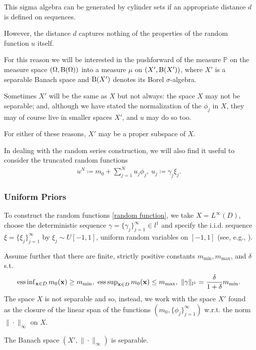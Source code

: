 \documentclass[oneside]{article}
\numberwithin{equation}{section}
\begin{document}
This sigma algebra can be generated by cylinder sets if an appropriate distance $d$ is defined on sequences.

However, the distance $d$ captures nothing of the properties of the random function $u$ itself.

For this reason we will be interested in the pushforward of the measure $\mathbb{P}$ on the measure space $(\Omega,{\rm B}(\Omega))$ into a measure $\mu$ on $(X',{\rm B}(X'))$, where $X'$ is a separable Banach space and ${\rm B}(X')$ denotes its Borel $\sigma$-algebra.

Sometimes $X'$ will be the same as $X$ but not always: the space $X$ may not be separable; and, although we have stated the normalization of the $\phi_j$ in $X$, they may of course live in smaller spaces $X'$, and $u$ may do so too.

For either of these reasons, $X'$ may be a proper subspace of $X$.

%
In dealing with the random series construction, we will also find it useful to consider the truncated random functions
\begin{align*}
    u^N\coloneqq m_0 + \sum_{j=1}^N u_j\phi_j,\ u_j\coloneqq\gamma_j\xi_j.
\end{align*}

\subsubsection{Uniform Priors}
To construct the random functions \eqref{random function}, we take $X = L^\infty(D)$, choose the deterministic sequence $\gamma = \{\gamma_j\}_{j=1}^\infty\in l^1$ and specify the i.i.d. sequence $\xi = \{\xi_j\}_{j=1}^\infty$ by $\xi_j\sim U[-1,1]$, uniform random variables on $[-1,1]$ (see, e.g., \cite[Sect. 3.3]{Pope2000}).

Assume further that there are finite, strictly positive constants $m_{\min},m_{\max}$, and $\delta$ s.t.
\begin{align*}
    \operatorname{ess\inf}_{{\bf x}\in D} m_0({\bf x})\ge m_{\min},\ \operatorname{ess\sup}_{{\bf x}\in D} m_0({\bf x})\le m_{\max},\ \|\gamma\|_{l^1} = \frac{\delta}{1 + \delta}m_{\min}.
\end{align*}
The space $X$ is not separable and so, instead, we work with the space $X'$ found as the closure of the linear span of the functions $(m_0,\{\phi_j\}_{j=1}^\infty)$ w.r.t. the norm $\|\cdot\|_\infty$ on $X$.

The Banach space $(X',\|\cdot\|_\infty)$ is separable.
\end{document}

